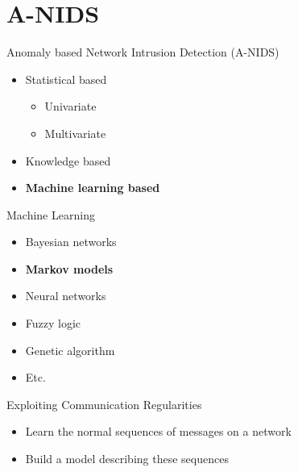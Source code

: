 \section{A-NIDS}

\begin{frame}
Anomaly based Network Intrusion Detection (A-NIDS)
\begin{itemize}
	\item Statistical based
		\begin{itemize}
			\item Univariate
			\item Multivariate
		\end{itemize}
	\item Knowledge based
	\item \textbf{Machine learning based}
\end{itemize}
\end{frame}


\begin{frame}
Machine Learning
\begin{itemize}
	\item Bayesian networks
	\item \textbf{Markov models}
	\item Neural networks
	\item Fuzzy logic
	\item Genetic algorithm
	\item Etc.
\end{itemize}	
\end{frame}


\begin{frame}
Exploiting Communication Regularities
\begin{itemize}
	\item Learn the normal sequences of messages on a network
	\item Build a model describing these sequences
\end{itemize}
\end{frame}